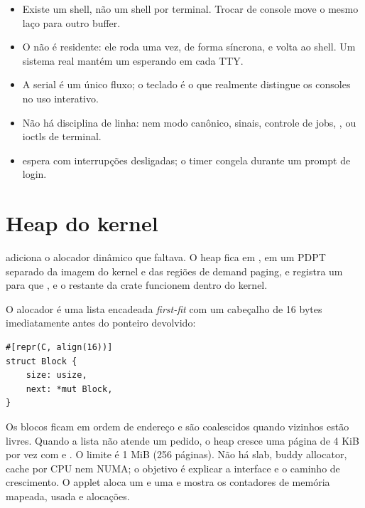 \begin{itemize}
  \item Existe um shell, n\~ao um shell por terminal. Trocar de console move o
        mesmo la\c{c}o para outro buffer.
  \item O  n\~ao \'e residente: ele roda uma vez, de forma
        s\'incrona, e volta ao shell. Um sistema real mant\'em um
         esperando em cada TTY.
  \item A serial \'e um \'unico fluxo; o teclado \'e o que realmente distingue
        os consoles no uso interativo.
  \item N\~ao h\'a disciplina de linha: nem modo can\^onico, sinais, controle
        de jobs, ,  ou ioctls de terminal.
  \item {} espera com interrup\c{c}\~oes desligadas; o timer congela
        durante um prompt de login.
\end{itemize}

\section{Heap do kernel}

 adiciona o alocador din\^amico que faltava. O heap fica em
, em um PDPT separado da imagem do kernel e das
regi\~oes de demand paging, e registra um  para que
,  e o restante da crate
 funcionem dentro do kernel.

O alocador \'e uma lista encadeada \emph{first-fit} com um cabe\c{c}alho de 16
bytes imediatamente antes do ponteiro devolvido:

\begin{lstlisting}[caption={Cabe\c{c}alho de bloco e n\'o da lista livre.},label={lst:heapblockpt}]
#[repr(C, align(16))]
struct Block {
    size: usize,
    next: *mut Block,
}
\end{lstlisting}

Os blocos ficam em ordem de endere\c{c}o e s\~ao coalescidos quando vizinhos
est\~ao livres. Quando a lista n\~ao atende um pedido, o heap cresce uma
p\'agina de 4 KiB por vez com  e
. O limite \'e 1 MiB (256 p\'aginas). N\~ao h\'a slab,
buddy allocator, cache por CPU nem NUMA; o objetivo \'e explicar a interface e
o caminho de crescimento. O applet  aloca um  e uma
 e mostra os contadores de mem\'oria mapeada, usada e
aloca\c{c}\~oes.

